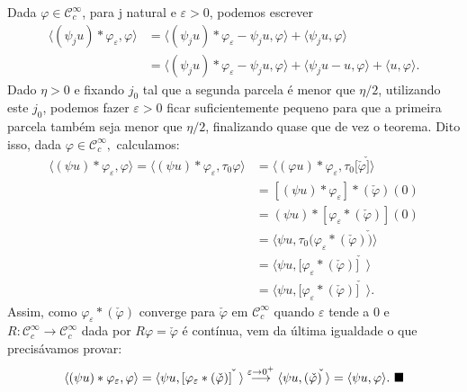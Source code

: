 \documentclass[../distribution_theory_notes.tex]{subfiles}
\begin{document}
\begin{proof*}
	Dada \(\varphi \in \mathcal{C}_{c}^{\infty}\), para j natural e \(\varepsilon > 0\), podemos escrever
	\begin{align*}
		\langle (\psi_{j}u)*\varphi_{\varepsilon }, \varphi  \rangle & = \langle (\psi_{j}u)*\varphi_{\varepsilon }-\psi_{j}u, \varphi  \rangle+\langle \psi_{j}u, \varphi  \rangle                                    \\
		                                                             & = \langle (\psi_{j}u)*\varphi_{\varepsilon }-\psi_{j}u, \varphi  \rangle + \langle \psi_{j}u-u, \varphi  \rangle + \langle u, \varphi  \rangle.
	\end{align*}
	Dado \(\eta > 0\) e fixando \(j_{0}\) tal que a segunda parcela é menor que \(\eta/2\), utilizando este \(j_{0}\), podemos fazer \(\varepsilon > 0\) ficar suficientemente pequeno para que a primeira parcela também seja menor que \(\eta/2\), finalizando quase que de vez o teorema.
	Dito isso, dada \(\varphi \in \mathcal{C}_{c}^{\infty},\) calculamos:
	\begin{align*}
		\langle (\psi u)*\varphi_{\varepsilon }, \varphi  \rangle = \langle (\psi u)*\varphi_{\varepsilon }, \tau_{0}\varphi  \rangle & = \langle (\varphi u)*\varphi_{\varepsilon }, \tau_{0}[\check{\varphi }\check{]} \rangle \\
		                                                                                                                              & = [(\psi u)*\varphi_{\varepsilon }]*(\check{\varphi })(0)                                \\
		                                                                                                                              & = (\psi u)*[\varphi_{\varepsilon }*(\check{\varphi })](0)                                \\
		                                                                                                                              & = \langle \psi u, \tau_{0}(\varphi_{\varepsilon }*(\check{\varphi })\check{)} \rangle    \\
		                                                                                                                              & = \langle \psi u, [\varphi_{\varepsilon }*(\check{\varphi})\check{]\;\;}\rangle          \\
		                                                                                                                              & = \langle \psi u, [\varphi_{\varepsilon }*(\check{\varphi})\check{]\;\;} \rangle.
	\end{align*}
	Assim, como \(\varphi_{\varepsilon }*(\check{\varphi })\) converge para \(\check{\varphi }\) em \(\mathcal{C}_{c}^{\infty}\) quando \(\varepsilon \) tende a 0 e \(R:\mathcal{C}_{c}^{\infty}\rightarrow \mathcal{C}_{c}^{\infty}\) dada por \(R\varphi =\check{\varphi }\) é contínua, vem da última igualdade o que precisávamos provar:
	\[
		\langle (\psi u)*\varphi_{\varepsilon }, \varphi  \rangle=\langle \psi u, [\varphi_{\varepsilon }*(\check{\varphi })\check{]\;\;} \rangle\stackrel{\varepsilon \to0^{+}}\longrightarrow \langle \psi u, (\check{\varphi }\check{)\;} \rangle=\langle \psi u, \varphi  \rangle. \text{ $\blacksquare$}
	\]
\end{proof*}
\end{document}
